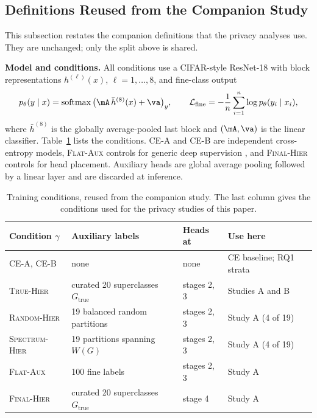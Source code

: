 \documentclass{article} %
\newcommand{\cn}[1]{\textsc{#1}}
\newcommand{\Gtrue}{G_{\mathrm{true}}}
\begin{document}
\subsection{Definitions Reused from the Companion Study}
\label{sec:reused}

This subsection restates the companion definitions that the privacy analyses use. They are unchanged; only the split above is shared.

\textbf{Model and conditions.} All conditions use a CIFAR-style ResNet-18 \citep{he2016resnet} with block representations $h^{(\ell)}(x)$, $\ell=1,\ldots,8$, and fine-class output
\begin{equation}
p_\theta(y\mid x)=\operatorname{softmax}\big(\mA\,\bar h^{(8)}(x)+\va\big)_y,\qquad
\mathcal{L}_{\mathrm{fine}}=-\frac{1}{n}\sum_{i=1}^{n}\log p_\theta(y_i\mid x_i),
\label{eq:fine}
\end{equation}
where $\bar h^{(8)}$ is the globally average-pooled last block and $(\mA,\va)$ is the linear classifier. Table~\ref{tab:conditions} lists the conditions. \cn{CE-A} and \cn{CE-B} are independent cross-entropy models, \cn{Flat-Aux} controls for generic deep supervision \citep{lee2015dsn}, and \cn{Final-Hier} controls for head placement. Auxiliary heads are global average pooling followed by a linear layer and are discarded at inference.

\begin{table}[t]
\caption{Training conditions, reused from the companion study. The last column gives the conditions used for the privacy studies of this paper.}
\label{tab:conditions}
\begin{center}
\small
\begin{tabular}{@{}llll@{}}
\toprule
Condition $\gamma$ & Auxiliary labels & Heads at & Use here \\
\midrule
\cn{CE-A}, \cn{CE-B} & none & none & CE baseline; RQ1 strata \\
\cn{True-Hier} & curated 20 superclasses $\Gtrue$ & stages 2, 3 & Studies A and B \\
\cn{Random-Hier} & 19 balanced random partitions & stages 2, 3 & Study A (4 of 19) \\
\cn{Spectrum-Hier} & 19 partitions spanning $W(G)$ & stages 2, 3 & Study A (4 of 19) \\
\cn{Flat-Aux} & 100 fine labels & stages 2, 3 & Study A \\
\cn{Final-Hier} & curated 20 superclasses $\Gtrue$ & stage 4 & Study A \\
\bottomrule
\end{tabular}
\end{center}
\end{table}
\end{document}
